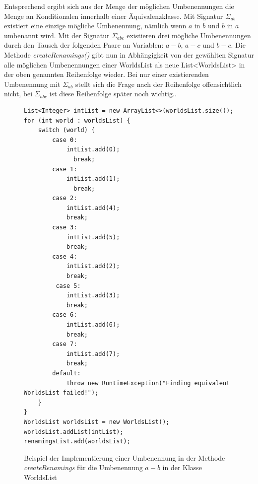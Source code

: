 \documentclass[12pt,a4paper]{article}
\begin{document}
Entsprechend ergibt sich aus der Menge der möglichen Umbenennungen die Menge an Konditionalen innerhalb einer Äquivalenzklasse. Mit Signatur $\Sigma_{ab}$ existiert eine einzige mögliche Umbenennung, nämlich wenn $a$ in $b$ und $b$ in $a$ umbenannt wird. Mit der Signatur $\Sigma_{abc}$ existieren drei mögliche Umbenennungen durch den Tausch der folgenden Paare an Variablen: $a-b$, $a-c$ und $b-c$. Die Methode \textit{createRenamings()} gibt nun in Abhängigkeit von der gewählten Signatur alle möglichen Umbenennungen einer WorldsList als neue List<WorldsList> in der oben genannten Reihenfolge wieder. Bei nur einer existierenden Umbenennung mit $\Sigma_{ab}$ stellt sich die Frage nach der Reihenfolge offensichtlich nicht, bei $\Sigma_{abc}$ ist diese Reihenfolge später noch wichtig..


\begin{figure}
\begin{lstlisting}
List<Integer> intList = new ArrayList<>(worldsList.size());
for (int world : worldsList) {
    switch (world) {
        case 0:
            intList.add(0);
              break;
        case 1:
            intList.add(1);
              break;
        case 2:
            intList.add(4);
            break;
        case 3:
            intList.add(5);
            break;
        case 4:
            intList.add(2);
            break;
         case 5:
            intList.add(3);
            break;
        case 6:
            intList.add(6);
            break;
        case 7:
            intList.add(7);
            break;
        default:
            throw new RuntimeException("Finding equivalent WorldsList failed!");
    }
}
WorldsList worldsList = new WorldsList();
worldsList.addList(intList);
renamingsList.add(worldsList);
\end{lstlisting}
\caption{Beispiel der Implementierung einer Umbenennung in der Methode \textit{createRenamings} für die Umbenennung $a-b$ in der Klasse WorldsList}
\label{code:renaming}
\end{figure}
\end{document}
